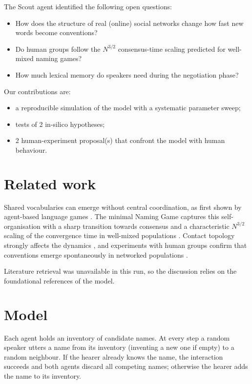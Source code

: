 \documentclass[11pt,a4paper]{article}
\begin{document}
The Scout agent identified the following open questions:
\begin{itemize}
  \item How does the structure of real (online) social networks change how fast new words become conventions?
  \item Do human groups follow the $N^{3/2}$ consensus-time scaling predicted for well-mixed naming games?
  \item How much lexical memory do speakers need during the negotiation phase?
\end{itemize}

Our contributions are:
\begin{itemize}
  \item a reproducible simulation of the model with a systematic parameter sweep;
  \item tests of 2 in-silico hypotheses;
  \item 2 human-experiment proposal(s) that confront the model with human behaviour.
\end{itemize}

\section{Related work}
Shared vocabularies can emerge without central coordination, as first shown by agent-based language games \citep{steels1995selforganizing}. The minimal Naming Game captures this self-organisation with a sharp transition towards consensus and a characteristic $N^{3/2}$ scaling of the convergence time in well-mixed populations \citep{baronchelli2006sharp}. Contact topology strongly affects the dynamics \citep{dallasta2006nonequilibrium}, and experiments with human groups confirm that conventions emerge spontaneously in networked populations \citep{centola2015spontaneous}.

Literature retrieval was unavailable in this run, so the discussion relies on the foundational references of the model.

\section{Model}
Each agent holds an inventory of candidate names. At every step a random speaker utters a name from its inventory (inventing a new one if empty) to a random neighbour. If the hearer already knows the name, the interaction succeeds and both agents discard all competing names; otherwise the hearer adds the name to its inventory.
\end{document}
